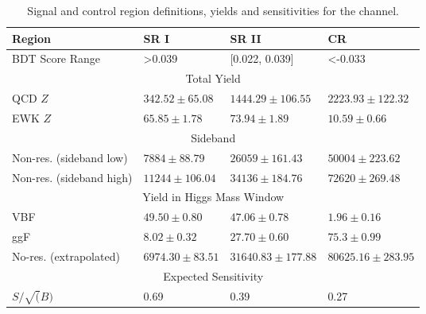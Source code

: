 \begin{table}[htbp]
\centering
\caption{Signal and control region definitions, yields and sensitivities for the \fourcentral channel. }
\label{tab:BDTReg4cen}
\begin{tabular}{|l|l|l|l|}
\hline
Region              & SR I       & SR II     & CR    \\ \hline
\hline
BDT Score Range &  >0.039 & [0.022, 0.039]   & <-0.033 \\ \hline

\multicolumn{4}{|c|}{Total Yield}                                                        \\ \hline
QCD $Z$  & $342.52 \pm 65.08$   &  $1444.29 \pm 106.55$  & $2223.93 \pm 122.32$     \\ \cline{2-4} 
EWK $Z$  & $65.85 \pm 1.78$   &  $73.94 \pm 1.89$ &    $10.59 \pm 0.66$  \\ \hline

\multicolumn{4}{|c|}{Sideband}  \\ \hline
Non-res. (sideband low)   & $ 7884 \pm 88.79$  & $26059 \pm 161.43 $ & $50004 \pm 223.62  $    \\ \cline{2-4} 
Non-res. (sideband high)  & $ 11244 \pm 106.04$  & $34136 \pm 184.76 $ & $72620 \pm 269.48 $   \\ \hline

\multicolumn{4}{|c|}{Yield in Higgs Mass Window} \\
\hline
VBF                     & $49.50\pm 0.80$                  & $ 47.06\pm 0.78$                 & $1.96 \pm 0.16$                    \\ \hline
ggF                     & $8.02 \pm 0.32$                  & $27.70 \pm 0.60$                 & $75.3 \pm 0.99$                    \\ \hline
No-res. (extrapolated) & $6974.30 \pm 83.51$                & $31640.83 \pm 177.88$               &  $80625.16 \pm 283.95$                  \\ \hline
\hline 
\multicolumn{4}{|c|}{Expected Sensitivity} \\
\hline
$S/ \sqrt(B)$           & 0.69                  & 0.39                  & 0.27                    \\ \hline
\end{tabular}
\end{table}
